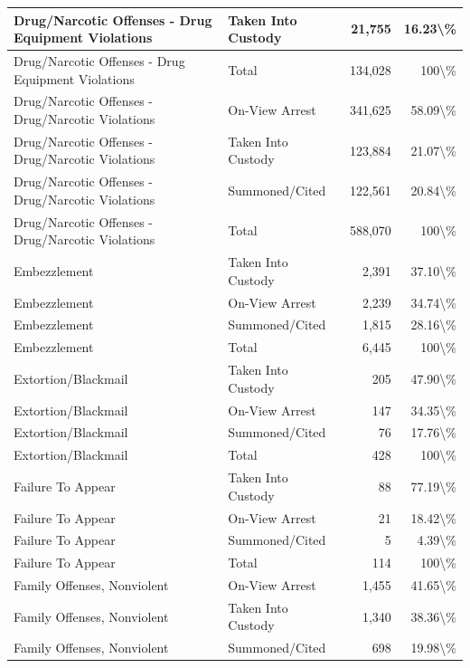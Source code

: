 \documentclass[
]{krantz}
\begin{document}
\begin{longtable}[t]{l|l|r|r}
\hline
Drug/Narcotic Offenses - Drug Equipment Violations & Taken Into Custody & 21,755 & 16.23\textbackslash{}\%\\
\hline
Drug/Narcotic Offenses - Drug Equipment Violations & Total & 134,028 & 100\textbackslash{}\%\\
\hline
Drug/Narcotic Offenses - Drug/Narcotic Violations & On-View Arrest & 341,625 & 58.09\textbackslash{}\%\\
\hline
Drug/Narcotic Offenses - Drug/Narcotic Violations & Taken Into Custody & 123,884 & 21.07\textbackslash{}\%\\
\hline
Drug/Narcotic Offenses - Drug/Narcotic Violations & Summoned/Cited & 122,561 & 20.84\textbackslash{}\%\\
\hline
Drug/Narcotic Offenses - Drug/Narcotic Violations & Total & 588,070 & 100\textbackslash{}\%\\
\hline
Embezzlement & Taken Into Custody & 2,391 & 37.10\textbackslash{}\%\\
\hline
Embezzlement & On-View Arrest & 2,239 & 34.74\textbackslash{}\%\\
\hline
Embezzlement & Summoned/Cited & 1,815 & 28.16\textbackslash{}\%\\
\hline
Embezzlement & Total & 6,445 & 100\textbackslash{}\%\\
\hline
Extortion/Blackmail & Taken Into Custody & 205 & 47.90\textbackslash{}\%\\
\hline
Extortion/Blackmail & On-View Arrest & 147 & 34.35\textbackslash{}\%\\
\hline
Extortion/Blackmail & Summoned/Cited & 76 & 17.76\textbackslash{}\%\\
\hline
Extortion/Blackmail & Total & 428 & 100\textbackslash{}\%\\
\hline
Failure To Appear & Taken Into Custody & 88 & 77.19\textbackslash{}\%\\
\hline
Failure To Appear & On-View Arrest & 21 & 18.42\textbackslash{}\%\\
\hline
Failure To Appear & Summoned/Cited & 5 & 4.39\textbackslash{}\%\\
\hline
Failure To Appear & Total & 114 & 100\textbackslash{}\%\\
\hline
Family Offenses, Nonviolent & On-View Arrest & 1,455 & 41.65\textbackslash{}\%\\
\hline
Family Offenses, Nonviolent & Taken Into Custody & 1,340 & 38.36\textbackslash{}\%\\
\hline
Family Offenses, Nonviolent & Summoned/Cited & 698 & 19.98\textbackslash{}\%\\

\end{longtable}
\end{document}
